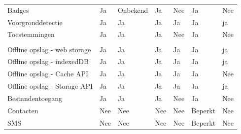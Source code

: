 \begin{table}[]
\begin{tabular}{p{6cm}p{13mm}p{15mm}p{13mm}p{13mm}p{13mm}p{13mm}}
			   Badges & \cellcolor{green!40} Ja  & \cellcolor{orange!50} Onbekend & \cellcolor{green!40} Ja & \cellcolor{red!50} Nee  & \cellcolor{green!40} Ja & \cellcolor{red!50} Nee \\
			   
			   Voorgronddetectie & \cellcolor{green!40} Ja  & \cellcolor{green!40} Ja & \cellcolor{green!40} Ja  & \cellcolor{green!40} Ja & \cellcolor{green!40} Ja & \cellcolor{green!40} ja \\
			   
			   Toestemmingen & \cellcolor{green!40} Ja  & \cellcolor{green!40} Ja & \cellcolor{green!40} Ja & \cellcolor{red!50} Nee  & \cellcolor{green!40} Ja & \cellcolor{red!50} Nee \\
			   
			   &  & &  &  &  &  \\
			   
			   Offline opslag - web storage & \cellcolor{green!40} Ja  & \cellcolor{green!40} Ja & \cellcolor{green!40} Ja  & \cellcolor{green!40} Ja & \cellcolor{green!40} Ja & \cellcolor{green!40} ja \\
			   
			   Offline opslag - indexedDB & \cellcolor{green!40} Ja  & \cellcolor{green!40} Ja & \cellcolor{green!40} Ja  & \cellcolor{green!40} Ja & \cellcolor{green!40} Ja & \cellcolor{green!40} ja \\
			   
			   Offline opslag - Cache API & \cellcolor{green!40} Ja  & \cellcolor{green!40} Ja & \cellcolor{green!40} Ja  & \cellcolor{green!40} Ja & \cellcolor{green!40} Ja & \cellcolor{red!50} Nee\\
			   
			   Offline opslag - Storage API & \cellcolor{green!40} Ja  & \cellcolor{green!40} Ja & \cellcolor{green!40} Ja  & \cellcolor{green!40} Ja & \cellcolor{green!40} Ja & \cellcolor{green!40} ja \\
			   
			   Bestandentoegang & \cellcolor{green!40} Ja  & \cellcolor{green!40} Ja & \cellcolor{green!40} Ja & \cellcolor{red!50} Nee  & \cellcolor{green!40} Ja & \cellcolor{red!50} Nee \\
			   
			   Contacten &  \cellcolor{red!50} Nee  &  \cellcolor{red!50} Nee &  \cellcolor{red!50} Nee  & \cellcolor{red!50} Nee &  \cellcolor{orange!50} Beperkt &  \cellcolor{red!50} Nee \\
			   
			   SMS &  \cellcolor{red!50} Nee  &  \cellcolor{red!50} Nee &  \cellcolor{red!50} Nee  & \cellcolor{red!50} Nee &  \cellcolor{orange!50} Beperkt &  \cellcolor{red!50} Nee \\
			   

\end{tabular}
\end{table}
